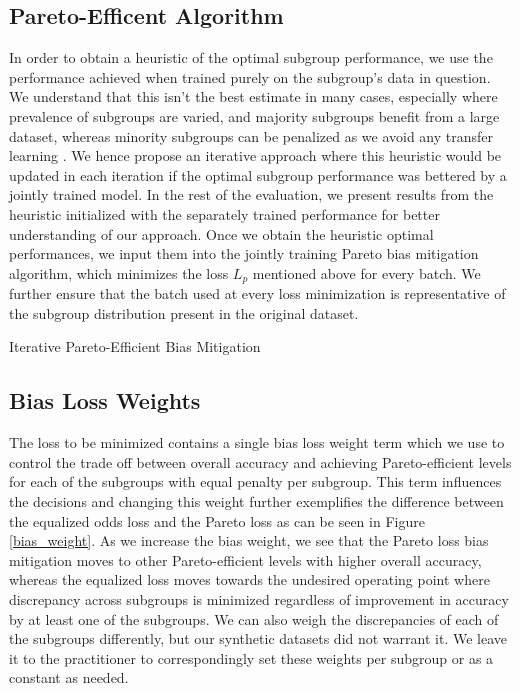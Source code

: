 \subsection{Pareto-Efficent Algorithm}
In order to obtain a heuristic of the optimal subgroup performance, we use the performance achieved when trained purely on the subgroup's data in question. We understand that this isn't the best estimate in many cases, especially where prevalence of subgroups are varied, and majority subgroups benefit from a large dataset, whereas minority subgroups can be penalized as we avoid any transfer learning \cite{PapernotAEGT16}. We hence propose an iterative approach where this heuristic would be updated in each iteration if the optimal subgroup performance was bettered by a jointly trained model. In the rest of the evaluation, we present results from the heuristic initialized with the separately trained performance for better understanding of our approach. Once we obtain the heuristic optimal performances, we input them into the jointly training Pareto bias mitigation algorithm, which minimizes the loss $L_p$ mentioned above for every batch. We further ensure that the batch used at every loss minimization is representative of the subgroup distribution present in the original dataset.

\begin{algorithm}
\caption{Iterative Pareto-Efficient Bias Mitigation}
\label{alg:algorithm-pareto}
\begin{algorithmic}
\ENDWHILE
\end{algorithmic}
\end{algorithm}

\subsection{Bias Loss Weights}
The loss to be minimized contains a single bias loss weight term which we use to control the trade off between overall accuracy and achieving Pareto-efficient levels for each of the subgroups with equal penalty per subgroup. This term influences the decisions and changing this weight further exemplifies the difference between the equalized odds loss and the Pareto loss as can be seen in Figure \ref{bias_weight}. As we increase the bias weight, we see that the Pareto loss bias mitigation moves to other Pareto-efficient levels with higher overall accuracy, whereas the equalized loss moves towards the undesired operating point where discrepancy across subgroups is minimized regardless of improvement in accuracy by at least one of the subgroups. We can also weigh the discrepancies of each of the subgroups differently, but our synthetic datasets did not warrant it. We leave it to the practitioner to correspondingly set these weights per subgroup or as a constant as needed. 

